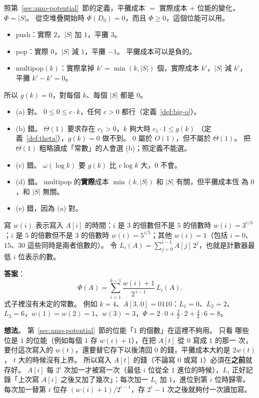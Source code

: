 照第~\ref{sec:amo-potential}~節的定義，平攤成本 $=$ 實際成本 $+$ 位能的變化，
$\Phi = |S|$。 從空堆疊開始時 $\Phi(D_0) = 0$，而且 $\Phi \ge 0$，這個位能可以用。
\begin{itemize}
\item push：實際 $2$，$|S|$ 加 $1$，平攤 $3$。
\item pop：實際 $0$，$|S|$ 減 $1$，平攤 $-1$。 平攤成本可以是負的。
\item multipop$(k)$：實際拿掉 $k' = \min(k, |S|)$ 個，實際成本 $k'$，$|S|$ 減 $k'$，
平攤 $k' - k' = 0$。
\end{itemize}
所以 $g(k) = 0$，對每個 $k$、每個 $|S|$ 都是 $0$。
\begin{itemize}
\item (a) 對。 $0 \le 0 \le c \cdot k$，任何 $c > 0$ 都行（定義~\ref{def:big-o}）。
\item (b) 錯。 $\Theta(1)$ 要求存在 $c_1 > 0$，$k$ 夠大時 $c_1 \cdot 1 \le g(k)$
（定義~\ref{def:theta}），$g(k) = 0$ 做不到。 $0$ 屬於 $O(1)$，但不屬於 $\Theta(1)$。
把 $\Theta(1)$ 粗略讀成「常數」的人會選 (b)；照定義不能選。
\item (c) 錯。 $\omega(\log k)$ 要 $g(k)$ 比 $c\log k$ 大，$0$ 不會。
\item (d) 錯。 multipop 的\textbf{實際}成本 $\min(k, |S|)$ 和 $|S|$ 有關，但平攤成本恆
為 $0$，和 $|S|$ 無關。
\item (e) 錯，因為 (a) 對。
\end{itemize}

寫 $w(i)$ 表示寫入 $A[i]$ 的時間：$i$ 是 $3$ 的倍數但不是 $5$ 的倍數時
$w(i) = 3^{i/3}$；$i$ 是 $5$ 的倍數但不是 $3$ 的倍數時 $w(i) = 5^{i/5}$；其他
$w(i) = 1$（包括 $i = 0$、$15$、$30$ 這些同時是兩者倍數的）。 令
$L_i(A) = \sum_{j=0}^{i-1} A[j]\, 2^j$，也就是計數器最低 $i$ 位表示的數。

\textbf{答案}：
\[
\Phi(A) = \sum_{i=1}^{k-1} \frac{w(i) + 1}{2^{\,i-1}} \, L_i(A) .
\]
式子裡沒有未定的常數。 例如 $k = 4$、$A[3..0] = 0110$：$L_1 = 0$、$L_2 = 2$、
$L_3 = 6$，$w(1) = w(2) = 1$、$w(3) = 3$，$\Phi = 2 \cdot 0 + \frac{2}{2} \cdot 2 +
\frac{4}{4} \cdot 6 = 8$。

\textbf{想法}。 第~\ref{sec:amo-potential}~節的位能「$1$ 的個數」在這裡不夠用。 只看
哪些位是 $1$ 的位能（例如每個 $1$ 存 $w(i) + 1$），在把 $A[t]$ 從 $0$ 寫成 $1$ 的那一
次，要付這次寫入的 $w(t)$，還要替它存下以後清回 $0$ 的錢，平攤成本大約是 $2w(t)$，
$t$ 大的時候沒有上界。 所以寫入 $A[t]$ 的錢（不論寫 $0$ 或寫
$1$）必須在\textbf{之前}就存好。 $A[i]$ 每 $2^i$ 次加一才被寫一次（最低 $i$ 位從全
$1$ 進位的時候），$L_i$ 正好記錄「上次寫 $A[i]$ 之後又加了幾次」：每次加一 $L_i$ 加
$1$，進位到第 $i$ 位時歸零。 每次加一替第 $i$ 位存 $(w(i) + 1)/2^{i-1}$，存 $2^i - 1$
次之後就夠付一次讀加寫。

